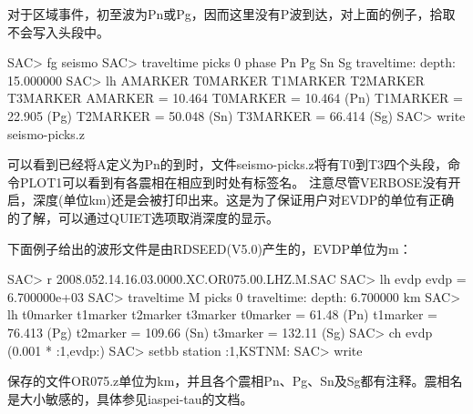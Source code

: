 对于区域事件，初至波为Pn或Pg，因而这里没有P波到达，对上面的例子，拾取不会写入头段中。
\begin{SACCode}
SAC> fg seismo
SAC> traveltime picks 0 phase Pn Pg Sn Sg
traveltime: depth: 15.000000
SAC> lh AMARKER T0MARKER T1MARKER T2MARKER T3MARKER
AMARKER = 10.464
T0MARKER = 10.464           (Pn)
T1MARKER = 22.905           (Pg)
T2MARKER = 50.048           (Sn)
T3MARKER = 66.414           (Sg)
SAC> write seismo-picks.z
\end{SACCode}
可以看到已经将A定义为Pn的到时，文件seismo-picks.z将有T0到T3四个头段，命令PLOT1可以看到有各震相在相应到时处有标签名。
注意尽管VERBOSE没有开启，深度(单位km)还是会被打印出来。这是为了保证用户对EVDP的单位有正确的了解，可以通过QUIET选项取消深度的显示。

下面例子给出的波形文件是由RDSEED(V5.0)产生的，EVDP单位为m：
\begin{SACCode}
SAC> r 2008.052.14.16.03.0000.XC.OR075.00.LHZ.M.SAC
SAC> lh evdp
evdp = 6.700000e+03
SAC> traveltime M picks 0
traveltime: depth: 6.700000 km
SAC> lh t0marker t1marker t2marker t3marker
t0marker = 61.48            (Pn)
t1marker = 76.413           (Pg)
t2marker = 109.66           (Sn)
t3marker = 132.11           (Sg)
SAC> ch evdp (0.001 * :1,evdp:)
SAC> setbb station :1,KSTNM:
SAC> write %
\end{SACCode}
保存的文件OR075.z单位为km，并且各个震相Pn、Pg、Sn及Sg都有注释。震相名是大小敏感的，具体参见iaspei-tau的文档。
